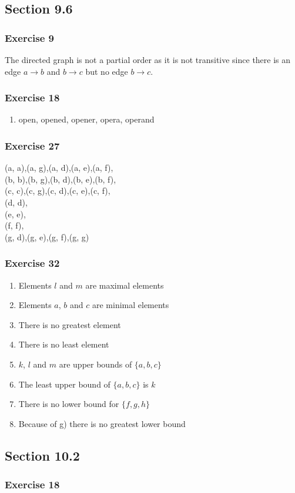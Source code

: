 \documentclass[a4paper]{article}
\newcommand{\ex}[1]{\subsubsection*{#1}}
\begin{document}
\pagestyle{fancy} %



\subsection*{Section 9.6}
\ex{Exercise 9}

The directed graph is not a partial order as it is not transitive since there
is an edge \(a \to b\) and \(b \to c\) but no edge \(b \to c\).


\ex{Exercise 18}

\begin{enumerate}[label=\alph*), start=2] 
    \item open, opened, opener, opera, operand
\end{enumerate}


\ex{Exercise 27} 

(a, a),(a, g),(a, d),(a, e),(a, f), \\
(b, b),(b, g),(b, d),(b, e),(b, f), \\
(c, c),(c, g),(c, d),(c, e),(c, f), \\
(d, d), \\
(e, e), \\
(f, f), \\
(g, d),(g, e),(g, f),(g, g)

\ex{Exercise 32}

\begin{enumerate}[label=-]
    \item Elements \(l\) and \(m\) are maximal elements
    \item Elements \(a\), \(b\) and \(c\) are minimal elements
    \item There is no greatest element
    \item There is no least element
    \item \(k\), \(l\) and \(m\) are upper bounds of \(\{a, b, c\}\)
    \item The least upper bound of \(\{a, b, c\}\) is \(k\)
    \item There is no lower bound for \(\{f, g, h\}\)
    \item Because of g) there is no greatest lower bound
\end{enumerate}

\subsection*{Section 10.2}
\ex{Exercise 18}
\end{document}
